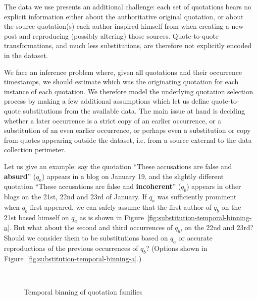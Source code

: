 The data we use presents an additional challenge: each set of quotations bears no explicit information either about the authoritative original quotation, or about the source quotation(s) each author inspired himself from when creating a new post and reproducing (possibly altering) those sources.
Quote-to-quote transformations, and much less substitutions, are therefore not explicitly encoded in the dataset.

We face an inference problem where, given all quotations and their occurrence timestamps, we should estimate which was the originating quotation for each instance of each quotation.
We therefore model the underlying quotation selection process by making a few additional assumptions which let us define quote-to-quote substitutions from the available data.
The main issue at hand is deciding whether a later occurrence is a strict copy of an earlier occurrence, or a substitution of an even earlier occurrence, or perhaps even a substitution or copy from quotes appearing outside the dataset, \hbox{i.e.} from a source external to the data collection perimeter.

Let us give an example: say the quotation ``These accusations are false and \textbf{absurd}'' ($q_a$) appears in a blog on January 19, and the slightly different quotation ``These accusations are false and \textbf{incoherent}'' ($q_b$) appears in other blogs on the 21st, 22nd and 23rd of January.
If $q_a$ was sufficiently prominent when $q_b$ first appeared, we can safely assume that the first author of $q_b$ on the 21st based himself on $q_a$ as is shown in Figure~\ref{fig:substitution-temporal-binning-a}.
But what about the second and third occurrences of $q_b$, on the 22nd and 23rd?
Should we consider them to be substitutions based on $q_a$ %
or accurate reproductions of the previous occurrences of $q_b$? (Options shown in Figure~\ref{fig:substitution-temporal-binning-a}.)

\begin{figure}[h]
    \centering
	\hfill \\
	\caption{Temporal binning of quotation families}
    \label{fig:substitution-temporal-binning}
\end{figure}

